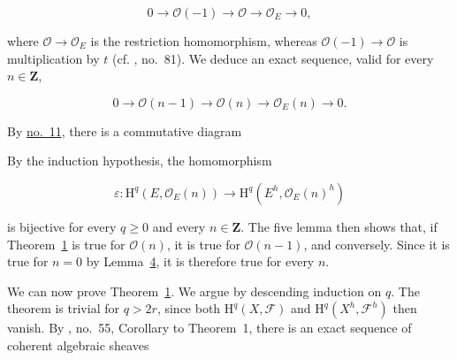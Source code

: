 \begin{equation*}
0\longrightarrow\mathcal{O}(-1)\longrightarrow\mathcal{O}
\longrightarrow\mathcal{O}_E\longrightarrow0,
\end{equation*}

where $\mathcal{O}\to\mathcal{O}_E$ is the restriction homomorphism, whereas $\mathcal{O}(-1)\to\mathcal{O}$ is multiplication by $t$ (cf. , no.~81). We deduce an exact sequence, valid for every $n\in\mathbf{Z}$,

\begin{equation*}
0\longrightarrow\mathcal{O}(n-1)\longrightarrow\mathcal{O}(n)
\longrightarrow\mathcal{O}_E(n)\longrightarrow0.
\end{equation*}

By \hyperref[gaga:no:11]{no.~11}, there is a commutative diagram

\begin{center}
\scriptsize
{}
\end{center}

By the induction hypothesis, the homomorphism

\begin{equation*}
\varepsilon:\mathrm{H}^{q}(E,\mathcal{O}_{E}(n))
\longrightarrow
\mathrm{H}^{q}(E^{h},\mathcal{O}_{E}(n)^{h})
\end{equation*}

is bijective for every $q\geqslant0$ and every $n\in\mathbf{Z}$. The five lemma then shows that, if Theorem~\hyperref[gaga:thm:1]{1} is true for $\mathcal{O}(n)$, it is true for $\mathcal{O}(n-1)$, and conversely. Since it is true for $n=0$ by Lemma~\hyperref[gaga:lemma:4]{4}, it is therefore true for every $n$.

We can now prove Theorem~\hyperref[gaga:thm:1]{1}. We argue by descending induction on $q$. The theorem is trivial for $q>2r$, since both $\mathrm{H}^q(X,\mathcal{F})$ and $\mathrm{H}^q(X^h,\mathcal{F}^h)$ then vanish. By , no.~55, Corollary to Theorem~1, there is an exact sequence of coherent algebraic sheaves

